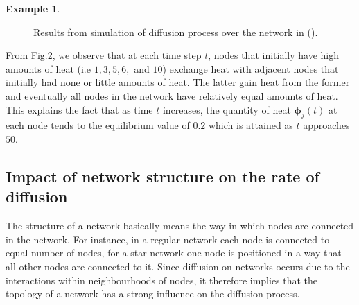 \documentclass[10pt,a4paper]{article}
\theoremstyle{plain}
\theoremstyle{definition}
\newtheorem{exa}[subsection]{Example}
\begin{document}
\begin{exa}
\begin{figure}[H]
\begin{subfigure}[b]{0.45\textwidth}
    	 			\caption{}
    	 			\label{difn-plot}
    	 		\end{subfigure}
    	 		\caption{ Results from simulation of diffusion process over the network in (). }
    	 		\label{graph-plot}
    	 	\end{figure}
     	  From Fig.\ref{graph-plot}, we observe that at each time step $t$, nodes that initially have high amounts of heat (i.e $1,3,5,6,$ and $10$) exchange heat with adjacent nodes that initially had none or little amounts of heat. The latter gain heat from the former and eventually all nodes in the network have relatively equal amounts of heat. This explains the fact that as time $t$ increases, the quantity of heat $\boldsymbol{\phi}_j(t)$ at each node tends to the equilibrium value of $0.2$ which is attained as $t$ approaches $50$. 
    	 \end{exa}
     
     \subsection{Impact of network structure on the rate of diffusion}
     The structure of a network basically means the way in which nodes are connected in the network. For instance, in a regular network each node is connected to equal number of nodes, for a star network one node is positioned in a way that all other nodes are connected to it. Since diffusion on networks occurs due to the interactions within neighbourhoods of nodes, it therefore implies that the topology of a network has a strong influence on the diffusion process. 
     
\end{document}
